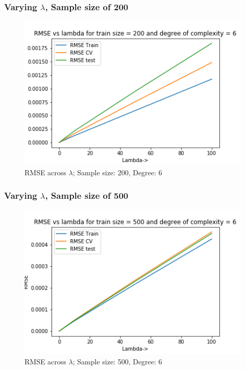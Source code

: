 \documentclass[12pt,a4paper]{article}
\begin{document}
\subsubsection{Varying $\lambda$, Sample size of 200}



\begin{figure}[H]
     \centering
     \includegraphics[scale=0.7]{images/d6_200.png}
     \caption{RMSE across $\lambda$; Sample size: 200, Degree: 6}
     \label{fig:d200}
\end{figure}
 
\subsubsection{Varying $\lambda$, Sample size of 500 }


 
\begin{figure}[H]
     \centering
     \includegraphics[scale=0.7]{images/d6_500.png}
     \caption{RMSE across $\lambda$; Sample size: 500, Degree: 6}
     \label{fig:d6500}
\end{figure}
 
\end{document}
